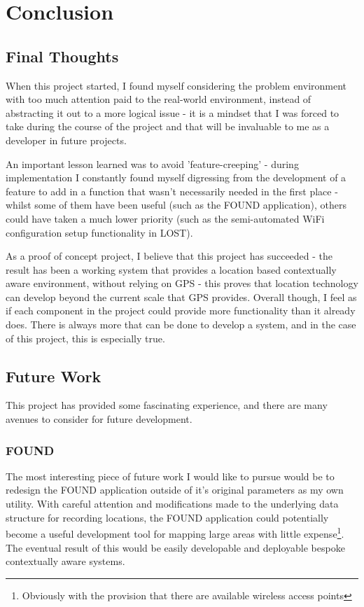 \documentclass[11pt]{informatics-report}
\begin{document}
\chapter{Conclusion}

\section{Final Thoughts}

When this project started, I found myself considering the problem environment with too much attention paid to the real-world environment, instead of abstracting it out to a more logical issue - it is a mindset that I was forced to take during the course of the project and that will be invaluable to me as a developer in future projects. 

An important lesson learned was to avoid 'feature-creeping' - during implementation I constantly found myself digressing from the development of a feature to add in a function that wasn't necessarily needed in the first place - whilst some of them have been useful (such as the FOUND application), others could have taken a much lower priority (such as the semi-automated WiFi configuration setup functionality in LOST). 

As a proof of concept project, I believe that this project has succeeded - the result has been a working system that provides a location based contextually aware environment, without relying on GPS - this proves that location technology can develop beyond the current scale that GPS provides. Overall though, I feel as if each component in the project could provide more functionality than it already does. There is always more that can be done to develop a system, and in the case of this project, this is especially true. 

\section{Future Work}

This project has provided some fascinating experience, and there are many avenues to consider for future development.

\subsection{FOUND}

The most interesting piece of future work I would like to pursue would be to redesign the FOUND application outside of it's original parameters as my own utility. With careful attention and modifications made to the underlying data structure for recording locations, the FOUND application could potentially become a useful development tool for mapping large areas with little expense\footnote{Obviously with the provision that there are available wireless access points}. The eventual result of this would be easily developable and deployable bespoke contextually aware systems. 
\end{document}
